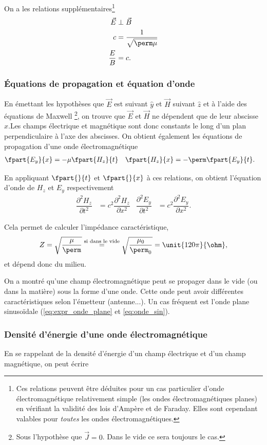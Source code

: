 On a les relations supplémentaires\footnote{Ces relations peuvent
être déduites pour un cas particulier d'onde
électromagnétique relativement simple (les ondes électromagnétiques
planes) en vérifiant la validité des lois d'Ampère et de Faraday.
Elles sont cependant valables pour \emph{toutes} les ondes
électromagnétiques.}
\begin{align*}
  \vec{E} & \perp \vec{B}\\
  c & = \frac{1}{\sqrt{\perm\mu}}\\
  \frac{E}{B} & = c.
\end{align*}

\subsubsection{Équations de propagation et équation d'onde}
En émettant les hypothèses que $\vec{E}$ est suivant $\hat{y}$ et $\vec{H}$ suivant $\hat{z}$ et à l'aide des équations de Maxwell
\footnote{Sous l'hypothèse que $\vec{J}=0$. Dans le vide ce sera toujours le cas.}, on trouve que $\vec{E}$ et $\vec{H}$ ne dépendent
que de leur abscisse $x$.Les champs électrique et magnétique sont donc constants le long d'un plan perpendiculaire à l'axe des abscisses.
On obtient également les équations de propagation d'une onde électromagnétique
\begin{align*}
\fpart{E_y}{x} &= -\mu \fpart{H_z}{t} & \fpart{H_z}{x} &= -\perm \fpart{E_y}{t}.
\end{align*}

En appliquant $\fpart{}{t}$ et $\fpart{}{x}$ à ces relations, on obtient l'équation d'onde de $H_z$ et $E_y$ respectivement
\begin{align*}
\dfrac{\partial^2 H_z}{\partial t^2} &=
c^2 \dfrac{\partial^2 H_z}{\partial x^2}
& \dfrac{\partial^2 E_y}{\partial t^2} &=
c^2 \dfrac{\partial^2 E_y}{\partial x^2}.
\end{align*}

Cela permet de calculer l'impédance caractéristique,
\[
Z = \sqrt{\dfrac{\mu}{\perm}} \overset{\text{si dans le vide}}{=} \sqrt{\dfrac{\mu_0}{\perm_0}} = \unit{120\pi}{\ohm},
\]
et dépend donc du milieu.

On a montré qu'une champ électromagnétique peut se propager dans le vide
(ou dans la matière) sous la forme d'une onde. Cette onde peut avoir différentes
caractéristiques selon l'émetteur (antenne...).
Un cas fréquent est l'onde plane sinusoïdale (\eqref{eq:expr_onde_plane} et
\eqref{eq:onde_sin}).

\subsubsection{Densité d'énergie d'une onde électromagnétique}
En se rappelant de la densité d'énergie d'un champ électrique et
d'un champ magnétique, on peut écrire

